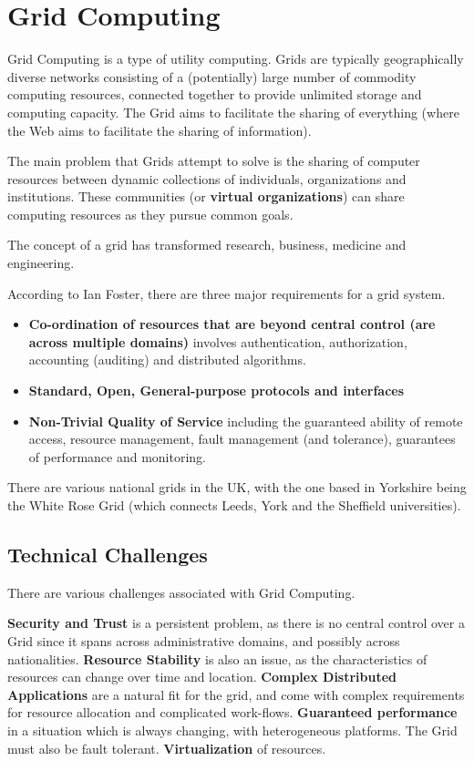 \documentclass{article}
\begin{document}
\section{Grid Computing}
Grid Computing is a type of utility computing. Grids are typically geographically diverse networks consisting of a (potentially) large number of commodity computing resources, connected together to provide unlimited storage and computing capacity. The Grid aims to facilitate the sharing of everything (where the Web aims to facilitate the sharing of information). 

The main problem that Grids attempt to solve is the sharing of computer resources between dynamic collections of individuals, organizations and institutions. These communities (or \textbf{virtual organizations}) can share computing resources as they pursue common goals. 

The concept of a grid has transformed research, business, medicine and engineering.

According to Ian Foster, there are three major requirements for a grid system.

\begin{itemize}
    \item \textbf{Co-ordination of resources that are beyond central control (are across multiple domains)} involves authentication, authorization, accounting (auditing) and distributed algorithms.
    \item \textbf{Standard, Open, General-purpose protocols and interfaces}
    \item \textbf{Non-Trivial Quality of Service} including the guaranteed ability of remote access, resource management, fault management (and tolerance), guarantees of performance and monitoring.
\end{itemize}

There are various national grids in the UK, with the one based in Yorkshire being the White Rose Grid (which connects Leeds, York and the Sheffield universities).

\subsection{Technical Challenges}
There are various challenges associated with Grid Computing.

\textbf{Security and Trust} is a persistent problem, as there is no central control over a Grid since it spans across administrative domains, and possibly across nationalities.
\textbf{Resource Stability} is also an issue, as the characteristics of resources can change over time and location.
\textbf{Complex Distributed Applications} are a natural fit for the grid, and come with complex requirements for resource allocation and complicated work-flows.
\textbf{Guaranteed performance} in a situation which is always changing, with heterogeneous platforms. The Grid must also be fault tolerant.
\textbf{Virtualization} of resources.
\end{document}
